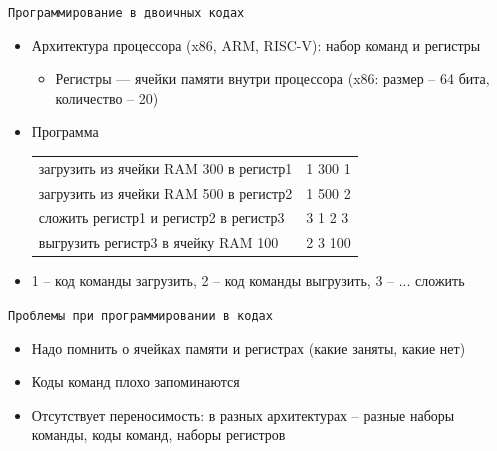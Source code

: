 \documentclass[pdf, 10pt, unicode]{beamer}
\begin{document}
\begin{frame}[fragile]{{\tt Программирование в двоичных кодах}}

\begin{itemize}
  \item Архитектура процессора (x86, ARM, RISC-V): набор команд и регистры
    \begin{itemize}
        \item Регистры --- ячейки памяти внутри процессора (x86: размер -- 64 бита, количество -- 20)
    \end{itemize}
  \item Программа
  \begin{tabular}{ll}
    загрузить из ячейки RAM 300 в регистр1 & 1 300 1 \\
    загрузить из ячейки RAM 500 в регистр2 & 1 500 2 \\
    сложить регистр1 и регистр2 в регистр3 & 3 1 2 3\\
    выгрузить регистр3 в ячейку RAM 100 & 2 3 100 \\
  \end{tabular}
  \item 1 -- код команды загрузить, 2 -- код команды выгрузить, 3 -- ... сложить
\end{itemize}

\end{frame}

\begin{frame}[fragile]{{\tt Проблемы при программировании в кодах}}

\begin{itemize}
  \item Надо помнить о ячейках памяти и регистрах (какие заняты, какие нет)
  \item Коды команд плохо запоминаются
  \item Отсутствует переносимость: в разных архитектурах -- разные наборы команды, коды команд, наборы регистров
\end{itemize}

\end{frame}
\end{document}
